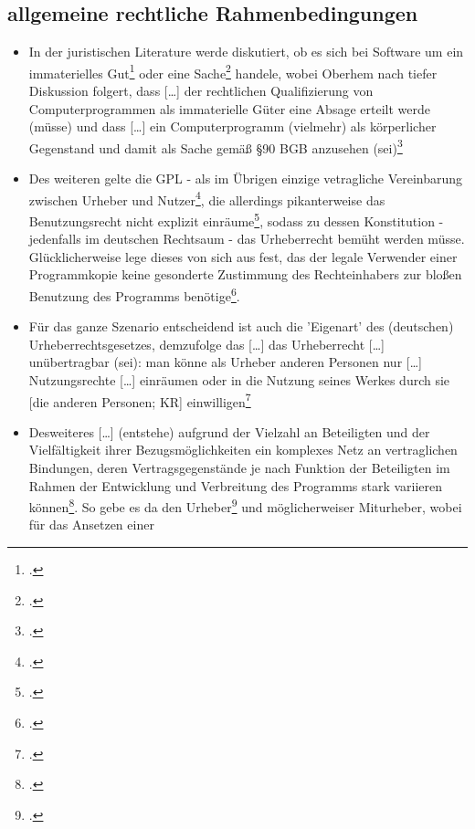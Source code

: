 \documentclass[DIV=calc,BCOR=5mm,11pt,headings=small,oneside,abstract=true, toc=bib]{scrartcl}
\begin{document}
\subsection{allgemeine rechtliche Rahmenbedingungen}
\begin{itemize}
  \item In der juristischen Literature werde diskutiert, ob es sich bei
  \glqq{}Software\grqq{} um ein \glqq{}immaterielles
  Gut\grqq{}\footcite[vgl.][53f]{Oberhem2008a} oder eine
  \glqq{}Sache\grqq{}\footcite[vgl.][55f]{Oberhem2008a} handele, wobei Oberhem
  nach tiefer Diskussion folgert, dass \glqq{}[\ldots] der rechtlichen
  Qualifizierung von Computerprogrammen als immaterielle Güter eine Absage
  erteilt werde (müsse)\grqq{} und dass \glqq{}[\ldots] ein
  Computerprogramm (vielmehr) als  körperlicher Gegenstand und damit als
  Sache gemäß §90 BGB anzusehen (sei)\grqq{}\footcite[vgl.][67f]{Oberhem2008a}
  \item Des weiteren gelte die GPL - als im Übrigen \glqq{}einzige
  vetragliche Vereinbarung zwischen Urheber und
  Nutzer\grqq{}\footcite[vgl.][71]{Oberhem2008a}, die allerdings pikanterweise
  das \glqq{}Benutzungsrecht\grqq{} nicht explizit
  einräume\footcite[vgl.][72]{Oberhem2008a}, sodass zu dessen Konstitution -
  jedenfalls im deutschen Rechtsaum -  das Urheberrecht bemüht werden müsse.
  Glücklicherweise lege dieses von sich aus fest, das der legale Verwender einer
  \glqq{}Programmkopie\grqq{} keine gesonderte \glqq{} Zustimmung des
  Rechteinhabers\grqq{} zur bloßen \glqq{}Benutzung\grqq{} des Programms
  benötige\footcite[vgl.][73]{Oberhem2008a}.
  \item Für das ganze Szenario entscheidend ist auch die 'Eigenart' des
  (deutschen) Urheberrechtsgesetzes, demzufolge das \glqq{}[\ldots] das
  Urheberrecht [\ldots] unübertragbar (sei)\grqq{}: man könne als Urheber
  \glqq{}anderen Personen\grqq{} nur \glqq{}[\ldots] Nutzungsrechte [\ldots]
  einräumen oder in die Nutzung seines Werkes durch sie [die anderen
  Personen; KR] einwilligen\grqq{}\footcite[vgl.][75]{Oberhem2008a}
  \item Desweiteres \glqq{}[\ldots] (entstehe) aufgrund der Vielzahl an
  Beteiligten und der Vielfältigkeit ihrer Bezugsmöglichkeiten ein
  komplexes Netz an vertraglichen Bindungen, deren Vertragsgegenstände je
  nach Funktion der Beteiligten im Rahmen der Entwicklung und Verbreitung
  des Programms stark variieren können\grqq{}\footcite[vgl.][89]{Oberhem2008a}.
  So gebe es da den \glqq{}Urheber\grqq{}\footcite[vgl.][78]{Oberhem2008a} und
  möglicherweiser \glqq{}Miturheber\grqq{}, wobei für das Ansetzen einer

\end{itemize}
\end{document}
